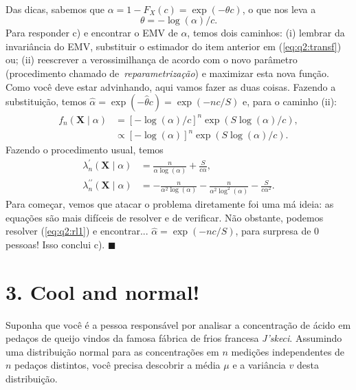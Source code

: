 \documentclass[a4paper,10pt, notitlepage]{report}
\begin{document}
{\\
Das dicas, sabemos que $\alpha = 1 - F_X(c) = \exp(-\theta c)$, o que nos leva a
\begin{equation}
\label{eq:q2:transf}
\theta = -\log(\alpha)/c. 
\end{equation}
Para responder c) e encontrar o EMV de $\alpha$, temos dois caminhos: (i) lembrar da invariância do EMV, substituir o estimador do item anterior em (\ref{eq:q2:transf}) ou; (ii) reescrever a verossimilhança de acordo com o novo parâmetro (procedimento chamado de~\textit{reparametrização}) e maximizar esta nova função.
Como você deve estar advinhando, aqui vamos fazer as duas coisas.
Fazendo a substituição, temos $\hat{\alpha} = \exp(-\hat{\theta}c) = \exp(-nc/S)$ e, para o caminho (ii):
\begin{align*}
 f_n(\boldsymbol{X} \mid \alpha) &= [-\log(\alpha)/c]^n \exp\left(S\log(\alpha)/c\right),\\
 &\propto [-\log(\alpha)]^n \exp\left(S\log(\alpha)/c\right).
\end{align*}
Fazendo o procedimento usual, temos
\begin{align}
\label{eq:q2:rl1}
 \lambda_n^\prime(\boldsymbol{X} \mid \alpha) &= \frac{n}{\alpha \log(\alpha)} + \frac{S}{c\alpha},\\
 \label{eq:q2:rl2}
 \lambda_n^{\prime\prime}(\boldsymbol{X} \mid \alpha) &= -\frac{n}{\alpha^2\log(\alpha)}-\frac{n}{\alpha^2\log^2(\alpha)}-\frac{S}{c\alpha^2}.
\end{align}
Para começar, vemos que atacar o problema diretamente foi uma má ideia: as equações são mais difíceis de resolver e de verificar.
Não obstante, podemos resolver (\ref{eq:q2:rl1}) e encontrar...
$\hat{\alpha} =  \exp(-nc/S)$, para surpresa de $0$ pessoas!
Isso conclui c).
$\blacksquare$
}

\section*{3. Cool and normal!}

Suponha que você é a pessoa responsável por analisar a concentração de ácido em pedaços de queijo vindos da famosa fábrica de frios francesa \textit{J'skeci}.
Assumindo uma distribuição normal para as concentrações em $n$ medições independentes de $n$ pedaços distintos, você precisa descobrir a média $\mu$ e a variância $v$ desta distribuição.
\end{document}
